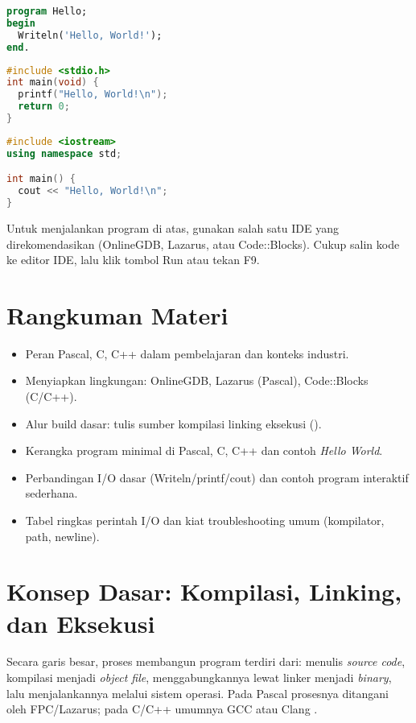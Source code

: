 \documentclass[../main.tex]{subfiles}
\begin{document}
\begin{lstlisting}[language=Pascal, caption={Hello World pada Pascal}]
program Hello;
begin
  Writeln('Hello, World!');
end.
\end{lstlisting}

\begin{lstlisting}[language=C, caption={Hello World pada C}]
#include <stdio.h>
int main(void) {
  printf("Hello, World!\n");
  return 0;
}
\end{lstlisting}

\begin{lstlisting}[language=C++, caption={Hello World pada C++}]
#include <iostream>
using namespace std;

int main() {
  cout << "Hello, World!\n";
}
\end{lstlisting}

Untuk menjalankan program di atas, gunakan salah satu IDE yang direkomendasikan (OnlineGDB, Lazarus, atau Code::Blocks). Cukup salin kode ke editor IDE, lalu klik tombol Run atau tekan F9.

\section{Rangkuman Materi}
\begin{itemize}
  \item Peran Pascal, C, C++ dalam pembelajaran dan konteks industri.
  \item Menyiapkan lingkungan: OnlineGDB, Lazarus (Pascal), Code::Blocks (C/C++).
  \item Alur build dasar: tulis sumber \textrightarrow{} kompilasi \textrightarrow{} linking \textrightarrow{} eksekusi ().
  \item Kerangka program minimal di Pascal, C, C++ dan contoh \emph{Hello World}.
  \item Perbandingan I/O dasar (Writeln/printf/cout) dan contoh program interaktif sederhana.
  \item Tabel ringkas perintah I/O dan kiat troubleshooting umum (kompilator, path, newline).
\end{itemize}

\section{Konsep Dasar: Kompilasi, Linking, dan Eksekusi}
Secara garis besar, proses membangun program terdiri dari: menulis \emph{source code}, kompilasi menjadi \emph{object file}, menggabungkannya lewat linker menjadi \emph{binary}, lalu menjalankannya melalui sistem operasi. Pada Pascal prosesnya ditangani oleh FPC/Lazarus; pada C/C++ umumnya GCC atau Clang \parencite{free-pascal-docs,gnu-c-manual,cpp-reference}.
\end{document}
